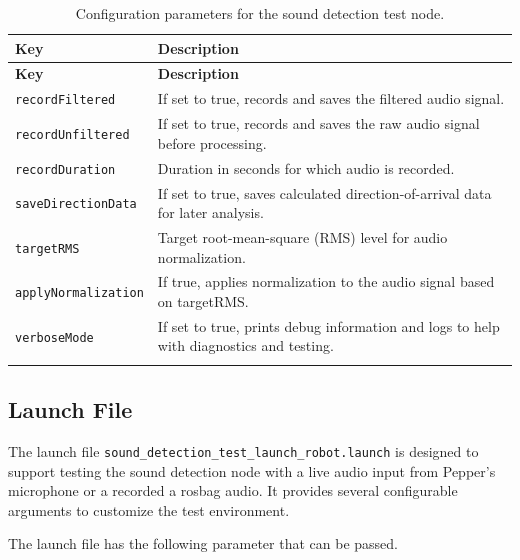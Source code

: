 \documentclass{CSSRforAfrica}
\begin{document}
\begin{longtable}{| l | p{10.5cm} |}
	\hline
	\rowcolor{blue!20}
	\textbf{Key} & \textbf{Description} \\
	\hline
	\endfirsthead
	
	\hline
	\rowcolor{blue!20}
	\textbf{Key} & \textbf{Description} \\
	\hline
	\endhead
	
	\texttt{recordFiltered} & If set to true, records and saves the filtered audio signal. \\
	\hline
	\texttt{recordUnfiltered} & If set to true, records and saves the raw audio signal before processing. \\
	\hline
	\texttt{recordDuration} & Duration in seconds for which audio is recorded. \\
	\hline
	\texttt{saveDirectionData} & If set to true, saves calculated direction-of-arrival data for later analysis. \\
	\hline
	\texttt{targetRMS} & Target root-mean-square (RMS) level for audio normalization. \\
	\hline
	\texttt{applyNormalization} & If true, applies normalization to the audio signal based on targetRMS. \\
	\hline
	\texttt{verboseMode} & If set to true, prints debug information and logs to help with diagnostics and testing. \\
	\hline
	
	\caption{Configuration parameters for the sound detection test node.}
	\label{tab:sound_detection_test_config}
\end{longtable}

\subsection*{Launch File}
The launch file \texttt{sound\_detection\_test\_launch\_robot.launch} is designed to support testing the sound detection node with a live audio input from Pepper's microphone or a recorded a rosbag audio. It provides several configurable arguments to customize the test environment.   

The launch file has the following parameter that can be passed.
\end{document}

